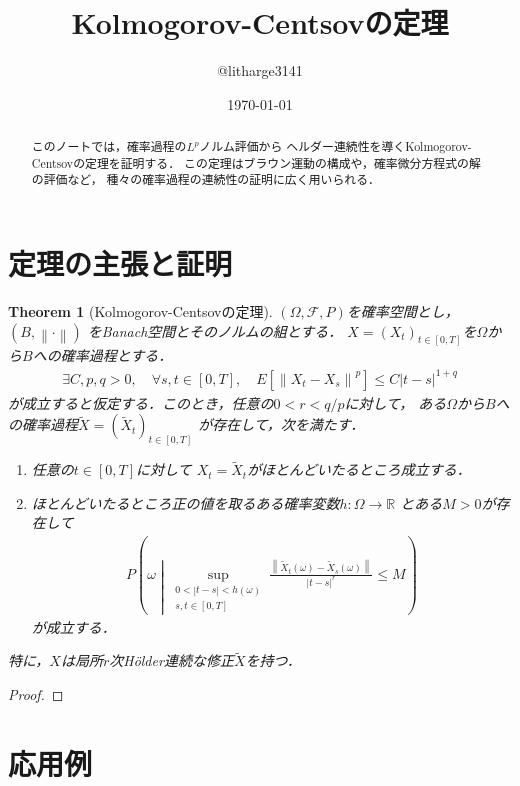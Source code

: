 \documentclass[dvipdfmx,autodetect-engine]{jsarticle}
\newtheorem{theorem}{Theorem}[section]
\theoremstyle{remark}
\theoremstyle{definition}
\newcommand{\R}{\mathbb{R}}
\newcommand{\abs}[1]{\left\lvert#1\right\rvert}
\newcommand{\norm}[1]{\left\lVert#1\right\rVert}
\newcommand{\setmid}{\mathrel{} \middle|\mathrel{}}
\begin{document}
\title{Kolmogorov-Centsovの定理}
\author{@litharge3141}
\date{\today}
\maketitle

\begin{abstract}
    このノートでは，確率過程の$L^p$ノルム評価から
    ヘルダー連続性を導くKolmogorov-Centsovの定理を証明する．
    この定理はブラウン運動の構成や，確率微分方程式の解の評価など，
    種々の確率過程の連続性の証明に広く用いられる．
\end{abstract}

\section{定理の主張と証明}
\begin{theorem}[Kolmogorov-Centsovの定理]
    $(\Omega,\mathcal{F},P)$を確率空間とし，$(B,\norm{\cdot})$
    をBanach空間とそのノルムの組とする．
    $X=(X_{t})_{t \in [0,T]}$を$\Omega$から$B$への確率過程とする．
    \begin{align}
        \exists C,p,q>0,\quad \forall s,t \in [0,T],
        \quad E[\norm{X_{t} - X_{s}}^p] \leq C \abs{t-s}^{1+q}
    \end{align}
    が成立すると仮定する．このとき，任意の$0 < r < q/p$に対して，
    ある$\Omega$から$B$への確率過程$\tilde{X}=(\tilde{X}_{t})_{t \in [0,T]}$
    が存在して，次を満たす．
    \begin{enumerate}
        \item 任意の$t \in [0,T]$に対して
        $X_t = \tilde{X}_t$がほとんどいたるところ成立する．
        \item ほとんどいたるところ正の値を取るある確率変数$h\colon \Omega \to \R$
        とある$M>0$が存在して
        \begin{align}
            P\left(\omega \setmid 
            \sup_{\substack{0 < \abs{t-s} < h(\omega) \\ s,t \in [0,T]}}
            \frac{\norm{\tilde{X}_{t}(\omega) - 
            \tilde{X}_{s}(\omega)}}{\abs{t-s}^{r}} 
            \leq M
            \right)
        \end{align}
        が成立する．
    \end{enumerate}
    特に，$X$は局所$r$次H\"{o}lder連続な修正$\tilde{X}$を持つ．
\end{theorem}

\begin{proof}
    
\end{proof}

\section{応用例}
\end{document}

